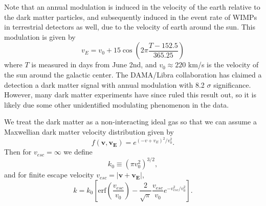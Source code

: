 \documentclass[a4paper,12pt]{article}
\begin{document}
Note that an annual modulation is induced in the velocity of the earth relative to the dark matter particles, and subsequently induced in the event rate of WIMPs in terrestrial detectors as well, due to the velocity of earth around the sun.  This modulation is given by 
\begin{equation}
v_E = v_0 + 15\cos \left(2\pi \frac{T - 152.5}{365.25} \right)
\end{equation}
where $T$ is measured in days from June 2nd, and $v_0 \approx 220$ km/s is the velocity of the sun around the galactic center. The DAMA/Libra collaboration has claimed a detection a dark matter signal with annual modulation with 8.2 $\sigma$ significance.  However, many dark matter experiments have since ruled this result out, so it is likely due some other unidentified modulating phenomenon in the data.

We treat the dark matter as a non-interacting ideal gas so that we can assume a Maxwellian dark matter velocity distribution given by
\begin{equation}
f(\mathbf{v},\mathbf{v_E})=e^{(-v+v_{E})^2/v_0^2}.
\end{equation}
Then for $v_{esc}=\infty$ we define
\begin{equation} \label{k-not}
k_0 \equiv (\pi v_0^2)^{3/2},
\end{equation}
and for finite escape velocity $v_{esc}=|\mathbf{v}+\mathbf{v_E}|$,
\begin{equation}
k=k_0 \left[\mbox{erf}(\frac{v_{esc}}{v_0}) - \frac{2}{\sqrt{\pi}} \frac{v_{esc}}{v_0} e^{-v_{esc}^2/v_0^2} \right].
\end{equation}
\end{document}
